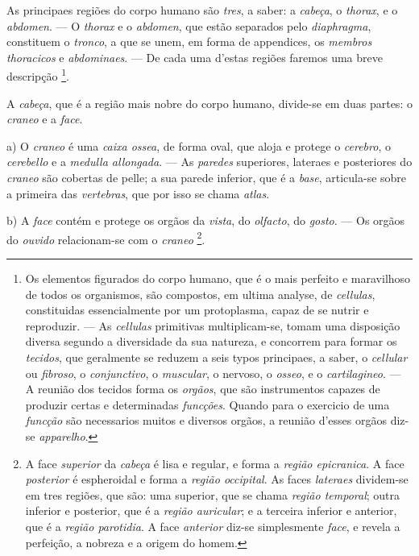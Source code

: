 As principaes regiões do corpo humano são \emph{tres}, a saber: a \emph{cabeça}, o \emph{thorax}, e o \emph{abdomen}. --- O \emph{thorax} e o \emph{abdomen}, que estão separados pelo \emph{diaphragma}, constituem o \emph{tronco}, a que se unem, em forma de appendices, os \emph{membros thoracicos} e \emph{abdominaes}. --- De cada uma d'estas regiões faremos uma breve descripção \footnote{Os elementos figurados do corpo humano, que é o mais perfeito e maravilhoso de todos os organismos, são compostos, em ultima analyse, de \emph{cellulas}, constituidas essencialmente por um protoplasma, capaz de se nutrir e reproduzir. --- As \emph{cellulas} primitivas multiplicam-se, tomam uma disposição diversa segundo a diversidade da sua natureza, e concorrem para formar os \emph{tecidos}, que geralmente se reduzem a seis typos principaes, a saber, o \emph{cellular} ou \emph{fibroso}, o \emph{conjunctivo}, o \emph{muscular}, o nervoso, o \emph{osseo}, e o \emph{cartilagineo}. --- A reunião dos tecidos forma os \emph{orgãos}, que são instrumentos capazes de produzir certas e determinadas \emph{funcções}. Quando para o exercicio de uma \emph{funcção} são necessarios muitos e diversos orgãos, a reunião d'esses orgãos diz-se \emph{apparelho}.}.


A \emph{cabeça}, que é a região mais nobre do corpo humano, divide-se em duas partes: o \emph{craneo} e a \emph{face}.

a) O \emph{craneo} é uma \emph{caixa ossea}, de forma oval, que aloja e protege o \emph{cerebro}, o \emph{cerebello} e a \emph{medulla allongada}. --- As \emph{paredes} superiores, lateraes e posteriores do \emph{craneo} são cobertas de pelle; a sua parede inferior, que é a \emph{base}, articula-se sobre a primeira das \emph{vertebras}, que por isso se chama \emph{atlas}.

b) A \emph{face} contém e protege os orgãos da \emph{vista}, do \emph{olfacto}, do \emph{gosto}. --- Os orgãos do \emph{ouvido} relacionam-se com o \emph{craneo} \footnote{A face \emph{superior} da \emph{cabeça} é lisa e regular, e forma a \emph{região epicranica}. A face \emph{posterior} é espheroidal e forma a \emph{região occipital}. As faces \emph{lateraes} dividem-se em tres regiões, que são: uma superior, que se chama \emph{região temporal}; outra inferior e posterior, que é a \emph{região auricular}; e a terceira inferior e anterior, que é a \emph{região parotidia}. A face \emph{anterior} diz-se simplesmente \emph{face}, e revela a perfeição, a nobreza e a origem do homem.}.

